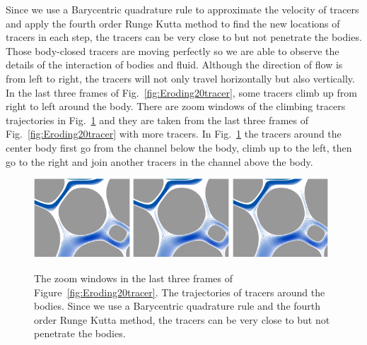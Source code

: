\documentclass[preprint, 10pt]{elsarticle}
\begin{document}
{Since we use a Barycentric quadrature rule to approximate the velocity
of tracers and apply the fourth order Runge Kutta method to find the new
locations of tracers in each step, the tracers can be very close to but
not penetrate the bodies.  Those body-closed tracers are moving
perfectly so we are able to observe the details of the interaction of
bodies and fluid.  Although the direction of flow is from left to right,
the tracers will not only travel horizontally but also vertically.  In
the last three frames of Fig.~\ref{fig:Eroding20tracer}, some tracers
climb up from right to left around the body.  There are zoom windows of
the climbing tracers trajectories in Fig.~\ref{fig:Eroding20zoom} and
they are taken from the last three frames of
Fig.~\ref{fig:Eroding20tracer} with more tracers.  In
Fig.~\ref{fig:Eroding20zoom} the tracers around the center body first go
from the channel below the body, climb up to the left, then go to the
right and join another tracers in the channel above the body. 
}
\begin{figure}[H]
\begin{center}
\includegraphics[width = 0.32\textwidth]{./figs/tracer_20b210_zoom}
\includegraphics[width = 0.32\textwidth]{./figs/tracer_20b240_zoom}
\includegraphics[width = 0.32\textwidth]{./figs/tracer_20b270_zoom}
\caption{\label{fig:Eroding20zoom}The zoom windows in the last three
  frames of Figure~\ref{fig:Eroding20tracer}. The trajectories of
  tracers around the bodies. Since we use a Barycentric quadrature rule
  and the fourth order Runge Kutta method, the tracers can be very close
  to but not penetrate the bodies.}
\end{center}
\end{figure}
\end{document}
